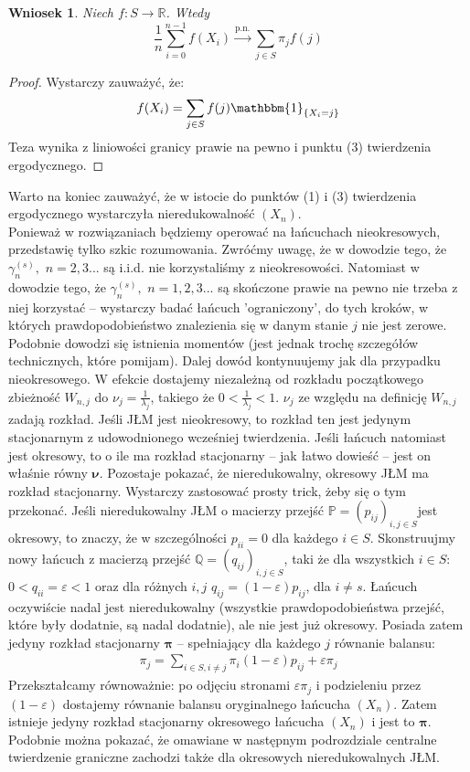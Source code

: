 \documentclass[a4paper]{article}
\theoremstyle{defn}
\theoremstyle{theorem}
\theoremstyle{lemma}
\theoremstyle{cor}
\newtheorem{cor}[defn]{Wniosek}
\theoremstyle{fact}
\begin{document}
\begin{cor}\label{cor2.5.14}
Niech $f: S \to \mathbb{R}$. Wtedy
$$ \frac{1}{n} \sum\limits_{i=0}^{n-1} f(X_i) \overset{\text{p.n.}}{\to} \sum\limits_{j \in S} \pi_j f(j)$$
\end{cor}
\begin{proof}
Wystarczy zauważyć, że:
$$ f(X_i) = \sum\limits_{j \in S} f(j)\mathbbm{1}_{\{X_i = j\}}$$
Teza wynika z liniowości granicy prawie na pewno i punktu (3) twierdzenia ergodycznego.
\end{proof}
Warto na koniec zauważyć, że w istocie do punktów (1) i (3) twierdzenia ergodycznego wystarczyła nieredukowalność $(X_n)$. \\
Ponieważ w rozwiązaniach będziemy operować na łańcuchach nieokresowych, przedstawię tylko szkic rozumowania. Zwróćmy uwagę, że w dowodzie tego, że $\gamma_n^{(s)},\,\, n = 2,3...$ są i.i.d. nie korzystaliśmy z nieokresowości. Natomiast w dowodzie tego, że $\gamma_n^{(s)},\,\, n = 1,2,3...$ są skończone prawie na pewno nie trzeba z niej korzystać – wystarczy badać łańcuch 'ograniczony', do tych kroków, w których prawdopodobieństwo znalezienia się w danym stanie $j$ nie jest zerowe. Podobnie dowodzi się istnienia momentów (jest jednak trochę szczegółów technicznych, które pomijam). Dalej dowód kontynuujemy jak dla przypadku nieokresowego. W efekcie dostajemy niezależną od rozkładu początkowego zbieżność $W_{n,j}$ do $\nu_j = \frac{1}{\lambda_j}$, takiego że $0 < \frac{1}{\lambda_j} < 1$. $\nu_j$ ze względu na definicję $W_{n,j}$ zadają rozkład. Jeśli JŁM jest nieokresowy, to rozkład ten jest jedynym stacjonarnym z udowodnionego wcześniej twierdzenia. Jeśli łańcuch natomiast jest okresowy, to o ile ma rozkład stacjonarny – jak łatwo dowieść – jest on właśnie równy $\boldsymbol{\nu}$. Pozostaje pokazać, że nieredukowalny, okresowy JŁM ma rozkład stacjonarny. Wystarczy zastosować prosty trick, żeby się o tym przekonać. Jeśli nieredukowalny JŁM o macierzy przejść $\mathbb{P} = (p_{ij})_{i,j \in S}$jest okresowy, to znaczy, że w szczególności $p_{ii} = 0$ dla każdego $i \in S$. Skonstruujmy nowy łańcuch z macierzą przejść $\mathbb{Q} = (q_{ij})_{i,j \in S}$, taki że dla wszystkich $i \in S$: $0 < q_{ii} = \varepsilon < 1$ oraz dla różnych $i,j$ $q_{ij} = (1-\varepsilon)p_{ij}$, dla $i \neq s$. Łańcuch oczywiście nadal jest nieredukowalny (wszystkie prawdopodobieństwa przejść, które były dodatnie, są nadal dodatnie), ale nie jest już okresowy. Posiada zatem jedyny rozkład stacjonarny $\boldsymbol{\pi}$ – spełniający dla każdego $j$ równanie balansu:
\begin{align*}
    \pi_j = \sum\limits_{i \in S, i \neq j} \pi_i (1-\varepsilon) p_{ij}  + \varepsilon \pi_j 
\end{align*}
Przekształcamy równoważnie: po odjęciu stronami $\varepsilon \pi_j$ i podzieleniu przez $(1-\varepsilon)$ dostajemy równanie balansu oryginalnego łańcucha $(X_n)$. Zatem istnieje jedyny rozkład stacjonarny okresowego łańcucha $(X_n)$ i jest to $\boldsymbol{\pi}$.
\\
Podobnie można pokazać, że omawiane w następnym podrozdziale centralne twierdzenie graniczne zachodzi także dla okresowych nieredukowalnych JŁM.
\end{document}
